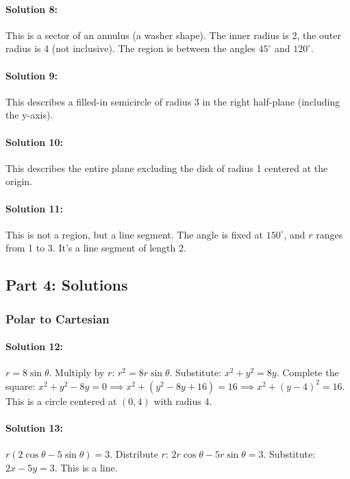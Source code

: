 \documentclass{article}
\begin{document}
\paragraph{Solution 8:} This is a sector of an annulus (a washer shape). The inner radius is 2, the outer radius is 4 (not inclusive). The region is between the angles $45^\circ$ and $120^\circ$.

\paragraph{Solution 9:} This describes a filled-in semicircle of radius 3 in the right half-plane (including the y-axis).

\paragraph{Solution 10:} This describes the entire plane excluding the disk of radius 1 centered at the origin.

\paragraph{Solution 11:} This is not a region, but a line segment. The angle is fixed at $150^\circ$, and $r$ ranges from 1 to 3. It's a line segment of length 2.

\subsection*{Part 4: Solutions}
\subsubsection*{Polar to Cartesian}
\paragraph{Solution 12:} $r = 8\sin\theta$. Multiply by $r$: $r^2 = 8r\sin\theta$. Substitute: $x^2 + y^2 = 8y$. Complete the square: $x^2 + y^2 - 8y = 0 \implies x^2 + (y^2 - 8y + 16) = 16 \implies x^2 + (y-4)^2 = 16$. This is a circle centered at $(0, 4)$ with radius 4.

\paragraph{Solution 13:} $r(2\cos\theta - 5\sin\theta) = 3$. Distribute $r$: $2r\cos\theta - 5r\sin\theta = 3$. Substitute: $2x - 5y = 3$. This is a line.
\end{document}
